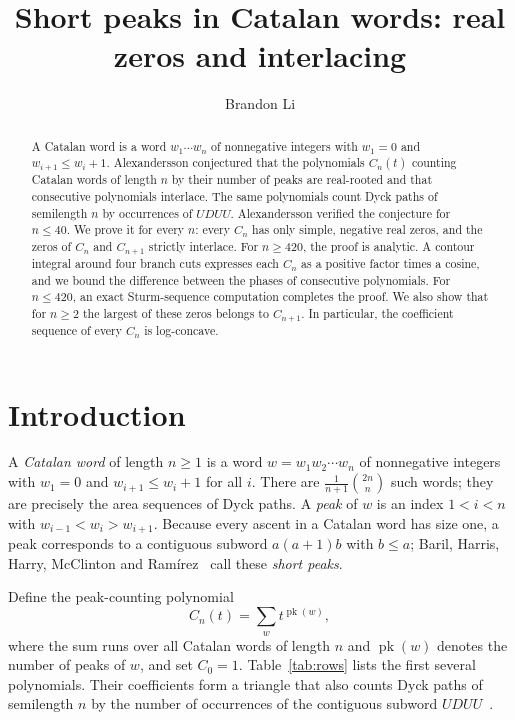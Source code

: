 \documentclass[11pt]{amsart}
\title{Short peaks in Catalan words: real zeros and interlacing}
\author{Brandon Li}
\theoremstyle{remark}
\newcommand{\pk}{\operatorname{pk}}
\begin{document}
\begin{abstract}
A Catalan word is a word $w_1\cdots w_n$ of nonnegative integers with $w_1=0$
and $w_{i+1}\le w_i+1$. Alexandersson conjectured that the polynomials
$C_n(t)$ counting Catalan words of length $n$ by their number of peaks are
real-rooted and that consecutive polynomials interlace. The same polynomials
count Dyck paths of semilength $n$ by occurrences of $UDUU$. Alexandersson verified the conjecture for $n\le 40$. We prove it for
every $n$: every $C_n$ has only simple, negative real zeros, and the zeros
of $C_n$ and $C_{n+1}$ strictly interlace. For $n\ge 420$, the proof is
analytic. A contour integral around four branch cuts expresses each $C_n$ as
a positive factor times a cosine, and we bound the difference between the
phases of consecutive polynomials. For $n\le 420$, an exact Sturm-sequence
computation completes the proof. We also show that for $n\ge2$ the largest of
these zeros belongs to $C_{n+1}$. In particular, the coefficient sequence of every $C_n$
is log-concave.
\end{abstract}
\maketitle

\section{Introduction}

A \emph{Catalan word} of length $n\ge1$ is a word $w=w_1w_2\cdots w_n$ of
nonnegative integers with $w_1=0$ and $w_{i+1}\le w_i+1$ for all $i$. There
are $\frac1{n+1}\binom{2n}{n}$ such words; they are precisely the area
sequences of Dyck paths. A \emph{peak} of $w$ is an index $1<i<n$ with
$w_{i-1}<w_i>w_{i+1}$. Because every ascent in a Catalan word has size one,
a peak corresponds to a contiguous subword $a(a+1)b$ with $b\le a$; Baril,
Harris, Harry, McClinton and Ram\'irez~\cite{BHHMR} call these \emph{short
peaks}.

Define the peak-counting polynomial
\[
 C_n(t)=\sum_{w}t^{\pk(w)},
\]
where the sum runs over all Catalan words of length $n$ and $\pk(w)$ denotes
the number of peaks of $w$, and set $C_0=1$. Table~\ref{tab:rows} lists the
first several polynomials. Their coefficients form a triangle that also
counts Dyck paths of semilength $n$ by the number of occurrences of the
contiguous subword $UDUU$~\cite{OEIS}.
\end{document}
